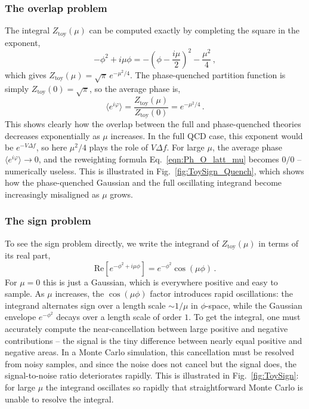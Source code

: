 \documentclass[11pt]{article}
\theoremstyle{definition}
\begin{document}
\subsubsection*{The overlap problem}
The integral $Z_{\mathrm{toy}}(\mu)$ can be computed exactly by completing the square in the exponent,
\begin{equation}
    -\phi^2 + i\mu\phi = -\left(\phi - \frac{i\mu}{2}\right)^2 - \frac{\mu^2}{4} \,,
\end{equation}
which gives $Z_{\mathrm{toy}}(\mu) = \sqrt{\pi}\, e^{-\mu^2/4}$. The phase-quenched partition function is simply $Z_{\mathrm{toy}}(0) = \sqrt{\pi}$, so the average phase is,
\begin{equation}\label{eqn:overlap_toy}
    \langle e^{i\varphi} \rangle = \frac{Z_{\mathrm{toy}}(\mu)}{Z_{\mathrm{toy}}(0)} = e^{-\mu^2/4} \,.
\end{equation}
This shows clearly how the overlap between the full and phase-quenched theories decreases exponentially as $\mu$ increases. In the full QCD case, this exponent would be $e^{-V\Delta f}$, so here $\mu^2/4$ plays the role of $V \Delta f$. For large $\mu$, the average phase $\langle e^{i\varphi}\rangle \to 0$, and the reweighting formula Eq.~\eqref{eqn:Ph_O_latt_mu} becomes $0/0$ -- numerically useless. This is illustrated in Fig.~\ref{fig:ToySign_Quench}, which shows how the phase-quenched Gaussian and the full oscillating integrand become increasingly misaligned as $\mu$ grows.

\subsubsection*{The sign problem}
To see the sign problem directly, we write the integrand of $Z_{\mathrm{toy}}(\mu)$ in terms of its real part,
\begin{equation}
    \mathrm{Re}\left[e^{-\phi^2 + i \mu \phi}\right] = e^{-\phi^2} \cos(\mu \phi) \,.
\end{equation}
For $\mu = 0$ this is just a Gaussian, which is everywhere positive and easy to sample. As $\mu$ increases, the $\cos(\mu\phi)$ factor introduces rapid oscillations: the integrand alternates sign over a length scale $\sim 1/\mu$ in $\phi$-space, while the Gaussian envelope $e^{-\phi^2}$ decays over a length scale of order $1$. To get the integral, one must accurately compute the near-cancellation between large positive and negative contributions -- the signal is the tiny difference between nearly equal positive and negative areas. In a Monte Carlo simulation, this cancellation must be resolved from noisy samples, and since the noise does not cancel but the signal does, the signal-to-noise ratio deteriorates rapidly. This is illustrated in Fig.~\ref{fig:ToySign}: for large $\mu$ the integrand oscillates so rapidly that straightforward Monte Carlo is unable to resolve the integral.
\end{document}
